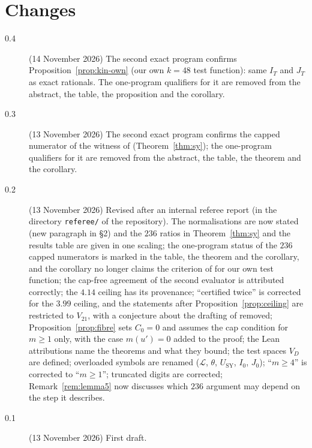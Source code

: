 \documentclass[11pt]{amsart}
\theoremstyle{definition}
\theoremstyle{remark}
\begin{document}
\section*{Changes}
\begin{description}
\item[0.4] (14 November 2026) The second exact program confirms
Proposition~\ref{prop:kin-own} (our own $k=48$ test function): same $I_T$ and
$J_T$ as exact rationals. The one-program qualifiers for it are removed from
the abstract, the table, the proposition and the corollary.
\item[0.3] (13 November 2026) The second exact program confirms the capped
numerator of the witness of \cite{SY26} (Theorem~\ref{thm:sy}); the
one-program qualifiers for it are removed from the abstract, the table, the
theorem and the corollary.
\item[0.2] (13 November 2026) Revised after an internal referee report
(in the directory \texttt{referee/} of the repository).
The normalisations are now stated (new paragraph in \S2) and the $236$ ratios
in Theorem~\ref{thm:sy} and the results table are given in one scaling;
the one-program status of the $236$ capped numerators is marked in the table,
the theorem and the corollary, and the corollary no longer claims the
criterion of \cite{SY26} for our own test function; the cap-free agreement of
the second evaluator is attributed correctly; the $4.14$ ceiling has its
provenance; ``certified twice'' is corrected for the $3.99$ ceiling, and the
statements after Proposition~\ref{prop:ceiling} are restricted to $V_{21}$,
with a conjecture about the drafting of \cite{Cha26} removed;
Proposition~\ref{prop:fibre} sets $C_0=0$ and assumes the cap condition for
$m\ge1$ only, with the case $m(u')=0$ added to the proof; the Lean
attributions name the theorems and what they bound; the test spaces $V_D$ are
defined; overloaded symbols are renamed ($\mathcal L$, $\theta$,
$U_{\mathrm{SY}}$, $I_0$, $J_0$); ``$m\ge4$'' is corrected to ``$m\ge1$'';
truncated digits are corrected; Remark~\ref{rem:lemma5} now discusses which
$236$ argument may depend on the step it describes.
\item[0.1] (13 November 2026) First draft.
\end{description}
\end{document}
